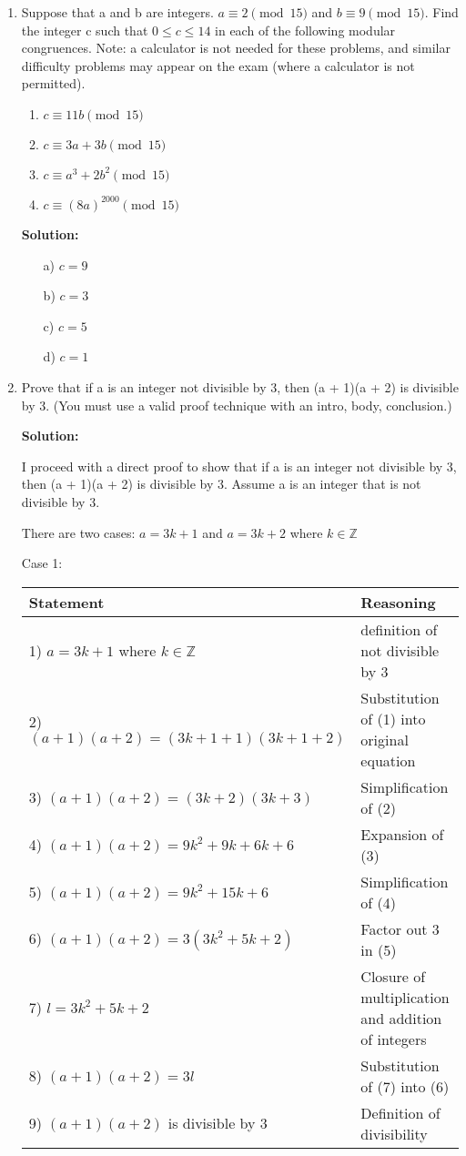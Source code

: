 \documentclass{article}
\newenvironment{solution}
{
\par
\color{blue}
\textbf{Solution:}
}
{
\par
}
\begin{document}
\begin{enumerate}
\item Suppose that a and b are integers. $a \equiv 2 \pmod{15}$ and $b \equiv 9 \pmod{15}$. Find the integer c such that $0 \leq c \leq 14$ in
each of the following modular congruences. Note: a calculator is not needed for these problems, and similar
difficulty problems may appear on the exam (where a calculator is not permitted).
\begin{enumerate}
    \item $c \equiv 11b \pmod{15}$
    \item $ c \equiv 3a +3b \pmod{15}$
    \item $c \equiv a^3 +2b^2 \pmod{15}$
    \item $c \equiv (8a)^{2000} \pmod{15}$
\end{enumerate}
    \begin{solution}
    \begin{enumerate}
        \item[a)] $c = 9$
        \item[b)] $c = 3$
        \item[c)] $c = 5$
        \item[d)] $c = 1$
    \end{enumerate}
    \end{solution}

\item Prove that if a is an integer not divisible by 3, then (a + 1)(a + 2) is divisible by 3. (You must use a valid proof technique with an intro, body, conclusion.)

\begin{solution}

I proceed with a direct proof to show that if a is an integer not divisible by 3, then (a + 1)(a + 2) is divisible by 3. Assume a is an integer that is not divisible by 3. 

There are two cases: $a = 3k + 1$ and $a = 3k + 2$ where $k \in \mathbb{Z}$

Case 1: \\
\begin{tabular}{l|l}
    Statement & Reasoning \\ \hline
    1) $a = 3k + 1$ where $k \in \mathbb{Z}$ & definition of not divisible by 3 \\
    2) $(a + 1)(a + 2) = (3k + 1 + 1)(3k + 1 + 2)$ & Substitution of (1) into original equation \\
    3) $(a + 1)(a + 2) = (3k + 2)(3k + 3)$ & Simplification of (2) \\
    4) $(a + 1)(a + 2) = 9k^2 + 9k + 6k + 6$ & Expansion of (3) \\
    5) $(a + 1)(a + 2) = 9k^2 + 15k + 6$ & Simplification of (4) \\
    6) $(a + 1)(a + 2) = 3(3k^2 + 5k + 2)$ & Factor out 3 in (5) \\
    7) $l = 3k^2 + 5k + 2$ & Closure of multiplication and addition of integers \\
    8) $(a + 1)(a + 2) = 3l$ & Substitution of (7) into (6) \\
    9) $(a + 1)(a + 2)$ is divisible by 3 & Definition of divisibility \\
\end{tabular}


\end{solution}
\end{enumerate}
\end{document}
